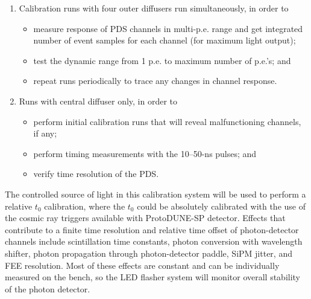 \begin{enumerate}
\item Calibration runs with four outer diffusers run simultaneously, in order to
   \begin{itemize}
   \item measure response of PDS channels in multi-p.e. range and get integrated number of event samples for each channel (for maximum light output);
   \item test  the dynamic range from 1 p.e. to maximum number of p.e.'s; and
   \item repeat runs periodically to trace any changes in channel response.
    \end{itemize}
\item Runs with central diffuser only, in order to
   \begin{itemize}
   \item perform initial calibration runs that will reveal malfunctioning channels, if any;
   \item perform timing measurements with the 10--50-ns pulses; and
    \item verify time resolution of the PDS.
   \end{itemize}
\end{enumerate}

The controlled source of light %
in this calibration system will be used to perform a relative $t_0$ calibration,  where the $t_0$ could be absolutely calibrated  with the use of the cosmic 
ray triggers available with ProtoDUNE-SP detector. 
Effects that contribute to a finite time resolution and relative time offset of photon-detector channels include scintillation time constants, 
photon conversion with wavelength shifter, photon propagation through photon-detector paddle, SiPM jitter, and FEE resolution. Most of these effects are constant and can be individually 
measured on the bench, so the LED flasher system will monitor overall stability of the photon detector.
